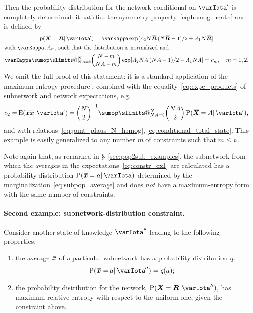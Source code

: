 \documentclass{article}
\makeatletter
\theoremstyle{remark}
\theoremstyle{innote}
\def\sum{\DOTSI\sumop\slimits@}
\newcommand*{\citep}{\parencites}
\renewcommand*{\|}{\mathpunct{|}}%
\renewcommand{\le}{\leqslant}%
\newcommand*{\pf}{\mathrm{p}}%
\newcommand*{\p}{\mathrm{P}}%
\newcommand*{\sect}{\S}%
\newcommand*{\eg}{{e.g.}}
\newcommand*{\E}{\mathrm{E}}
\DeclarePairedDelimiter\expp{(}{)}
\newcommand*{\expe}{\E\expp}%
\theoremstyle{simple}
\newcommand*{\widebar}[1]{{\mkern1.5mu\skew{2}\overline{\mkern-1.5mu#1\mkern-1.5mu}\mkern 1.5mu}}
\newcommand*{\av}{\widebar} %
\newcommand*{\sav}{\widebar} %
\newcommand*{\yxx}{x}%
\newcommand*{\yx}{\bm{\yxx}}%
\newcommand*{\yxs}{\sav{\yx}}%
\newcommand*{\yX}{\bm{X}}%
\newcommand*{\yXf}{\av{\yX}}%
\newcommand*{\yR}{\bm{R}}%
\newcommand*{\yRf}{\av{\yR}}%
\newcommand*{\yH}{\varIota}
\newcommand*{\yHa}{\varIota'}
\newcommand*{\yHb}{\varIota''}
\newcommand*{\yL}{\varLambda}
\makeatother
\begin{document}
\medskip Then the probability distribution for the network conditional on $\yHa$
is completely determined: it satisfies the symmetry
property~\eqref{eq:homog_math} and is defined by
\begin{multline}
  \label{eq:pop_distr_maxent1}
  \pf(\yX =\yR \|\yHa) =
\varKappa\exp[\yL_2 N\yRf\,(N\yRf-1)/2 + \yL_1 N\yRf]
\\
\!\begin{aligned}[b]
&\text{with $\varKappa, \yL_m$, such that the distribution is normalized and}
\\
&\varKappa\sum_{N A=0}^N %
\binom{N-m}{N A-m}
\exp[\yL_2 N A\,(N A-1)/2 + \yL_1 N A]
= c_m, \quad m=1,2.
\end{aligned}
\end{multline}
We omit the full proof of this statement: it is a standard application of
the maximum-entropy procedure
\citep[\eg:][]{jaynes1957,jaynes1963,good1963,jaynes1967,jaynes1979b,vancampenhoutetal1981,sivia1990,fangetal1997,bretthorst2013},
combined with the equality~\eqref{eq:expe_products} of subnetwork and
network expectations, \eg
\begin{equation}
  \label{eq:exploit_eq_expects}
  c_2 = \expe{\sav{\yx\yx}\|\yHa} = 
\binom{N}{2}^{-1}
\sum_{N A=0}^N %
\binom{N A}{2} \, \p(\yXf = A\|\yHa),
\end{equation}
and with relations~\eqref{eq:joint_plaus_N_homog},
\eqref{eq:conditional_total_state}. This example is easily generalized to
any number $m$ of constraints such that  $m\le n$.

Note again that, as remarked in \sect~\ref{sec:pop2sub_examples}, the
subnetwork from which the averages in the
expectations~\eqref{eq:constr_ex1} are calculated has a probability
distribution $\p(\yxs =a \|\yH)$ determined by the
marginalization~\eqref{eq:subpop_average} and does \emph{not} have a
maximum-entropy form with the same number of constraints.


\paragraph{Second example: subnetwork-distribution constraint.}
\label{sec:maxent_fullsubpop}
Consider another state of knowledge $\yHb$ leading to the following
properties:
\begin{enumerate}%
\item the average $\yxs$ of a particular
  subnetwork has a probability distribution $q$:
  \begin{equation}
    \label{eq:constr_subpop_distr}
    \p(\yxs =a \|\yHb) = q(a);
  \end{equation}
\item the probability distribution for the network, $\p(\yX = \yR
  \|\yHb)$, has maximum relative entropy with respect to the uniform
  one, given the constraint above.
\end{enumerate}
\end{document}
